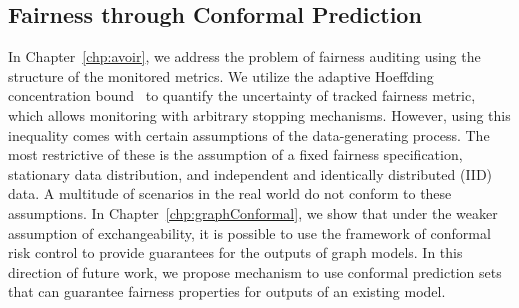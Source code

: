 \subsection{Fairness through Conformal Prediction}
In Chapter~\ref{chp:avoir}, we address the problem of fairness auditing using the structure of the monitored metrics.
We utilize the adaptive Hoeffding concentration bound~\cite{zhao2016adaptive} to quantify the uncertainty of tracked fairness metric, which allows monitoring with arbitrary stopping mechanisms.
However, using this inequality comes with certain assumptions of the data-generating process.
The most restrictive of these is the assumption of a fixed fairness specification, stationary data distribution, and independent and identically distributed (IID) data.
A multitude of scenarios in the real world do not conform to these assumptions.
In Chapter~\ref{chp:graphConformal}, we show that under the weaker assumption of exchangeability, it is possible to use the framework of conformal risk control to provide guarantees for the outputs of graph models.
In this direction of future work, we propose mechanism to use conformal prediction sets that can guarantee fairness properties for outputs of an existing model.
